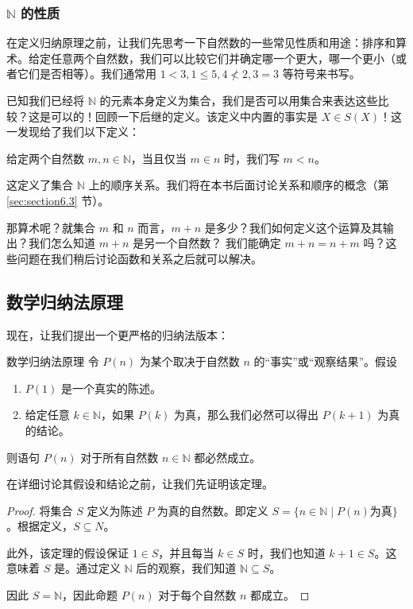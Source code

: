 \subsubsection*{$\mathbb{N}$ 的性质}

在定义归纳原理之前，让我们先思考一下自然数的一些常见性质和用途：排序和算术。给定任意两个自然数，我们可以比较它们并确定哪一个更大，哪一个更小（或者它们是否相等）。我们通常用 $1 < 3, 1 \le 5, 4 \nless 2, 3 = 3$ 等符号来书写。

已知我们已经将 $\mathbb{N}$ 的元素本身定义为集合，我们是否可以用集合来表达这些比较？这是可以的！回顾一下后继的定义。该定义中内置的事实是 $X \in S(X)$！这一发现给了我们以下定义：

\begin{definition}
    给定两个自然数 $m, n \in \mathbb{N}$，当且仅当 $m \in n$ 时，我们写 $m < n$。
\end{definition}

这定义了集合 $\mathbb{N}$ 上的顺序关系。我们将在本书后面讨论关系和顺序的概念（第 \ref{sec:section6.3} 节）。

那算术呢？就集合 $m$ 和 $n$ 而言，$m + n$ 是多少？我们如何定义这个运算及其输出？我们怎么知道 $m + n$ 是另一个自然数？ 我们能确定 $m + n = n + m$ 吗？这些问题在我们稍后讨论函数和关系之后就可以解决。

\subsection{数学归纳法原理}

现在，让我们提出一个更严格的归纳法版本：

\begin{theorem}{数学归纳法原理}\label{theorem3.8}
    令 $P(n)$ 为某个取决于自然数 $n$ 的``事实''或``观察结果''。假设
    \begin{enumerate}
        \item $P(1)$ 是一个真实的陈述。
        \item 给定任意 $k \in \mathbb{N}$，如果 $P(k)$ 为真，那么我们必然可以得出 $P(k + 1)$ 为真的结论。
    \end{enumerate}
    则语句 $P(n)$ 对于所有自然数 $n \in \mathbb{N}$ 都必然成立。
\end{theorem}

在详细讨论其假设和结论之前，让我们先证明该定理。

\begin{proof}
    将集合 $S$ 定义为陈述 $P$ 为真的自然数。即定义 $S = \{n \in \mathbb{N} \mid P(n) \text{为真}\}$。根据定义，$S \subseteq N$。

    此外，该定理的假设保证 $1 \in S$，并且每当 $k \in S$ 时，我们也知道 $k + 1 \in S$。这意味着 $S$ 是。通过定义 $\mathbb{N}$ 后的观察，我们知道 $\mathbb{N} \subseteq S$。

    因此 $S = \mathbb{N}$，因此命题 $P(n)$ 对于每个自然数 $n$ 都成立。
\end{proof}

